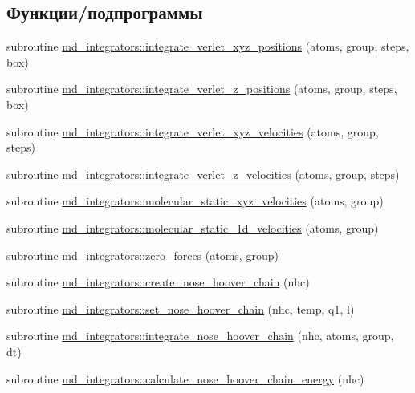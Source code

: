 \subsection*{Функции/подпрограммы}
\begin{DoxyCompactItemize}
\item 
subroutine \mbox{\hyperlink{namespacemd__integrators_a46897b8968c1901883654589ef731eb2}{md\+\_\+integrators\+::integrate\+\_\+verlet\+\_\+xyz\+\_\+positions}} (atoms, group, steps, box)
\item 
subroutine \mbox{\hyperlink{namespacemd__integrators_a89e015a65c39454223a09736f095aef0}{md\+\_\+integrators\+::integrate\+\_\+verlet\+\_\+z\+\_\+positions}} (atoms, group, steps, box)
\item 
subroutine \mbox{\hyperlink{namespacemd__integrators_a4aafa379de6ec22530aa0c426855689e}{md\+\_\+integrators\+::integrate\+\_\+verlet\+\_\+xyz\+\_\+velocities}} (atoms, group, steps)
\item 
subroutine \mbox{\hyperlink{namespacemd__integrators_ab71be6f8ca48e91d1a0e84d70b3176ac}{md\+\_\+integrators\+::integrate\+\_\+verlet\+\_\+z\+\_\+velocities}} (atoms, group, steps)
\item 
subroutine \mbox{\hyperlink{namespacemd__integrators_a37c12502ddb5537b8b963074dcd33132}{md\+\_\+integrators\+::molecular\+\_\+static\+\_\+xyz\+\_\+velocities}} (atoms, group)
\item 
subroutine \mbox{\hyperlink{namespacemd__integrators_aa4c7e5a4cfdd19fa542fccae43e9d35a}{md\+\_\+integrators\+::molecular\+\_\+static\+\_\+1d\+\_\+velocities}} (atoms, group)
\item 
subroutine \mbox{\hyperlink{namespacemd__integrators_afaf5cf45b5c0a8363d40dc012c954a1a}{md\+\_\+integrators\+::zero\+\_\+forces}} (atoms, group)
\item 
subroutine \mbox{\hyperlink{namespacemd__integrators_aa74788b2d003c16024b8eb999ea01c3c}{md\+\_\+integrators\+::create\+\_\+nose\+\_\+hoover\+\_\+chain}} (nhc)
\item 
subroutine \mbox{\hyperlink{namespacemd__integrators_a20d655980db9ce88983d738fc91ff021}{md\+\_\+integrators\+::set\+\_\+nose\+\_\+hoover\+\_\+chain}} (nhc, temp, q1, l)
\item 
subroutine \mbox{\hyperlink{namespacemd__integrators_a769781abbe7ac3aaacf761d6321d4722}{md\+\_\+integrators\+::integrate\+\_\+nose\+\_\+hoover\+\_\+chain}} (nhc, atoms, group, dt)
\item 
subroutine \mbox{\hyperlink{namespacemd__integrators_a67084641a81f648ac71c15c20428c015}{md\+\_\+integrators\+::calculate\+\_\+nose\+\_\+hoover\+\_\+chain\+\_\+energy}} (nhc)
\end{DoxyCompactItemize}
